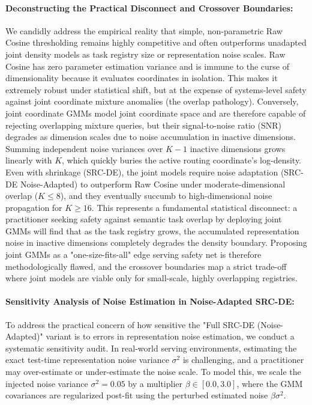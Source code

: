 \paragraph{Deconstructing the Practical Disconnect and Crossover Boundaries:} We candidly address the empirical reality that simple, non-parametric Raw Cosine thresholding remains highly competitive and often outperforms unadapted joint density models as task registry size or representation noise scales. Raw Cosine has zero parameter estimation variance and is immune to the curse of dimensionality because it evaluates coordinates in isolation. This makes it extremely robust under statistical shift, but at the expense of systems-level safety against joint coordinate mixture anomalies (the overlap pathology).
Conversely, joint coordinate GMMs model joint coordinate space and are therefore capable of rejecting overlapping mixture queries, but their signal-to-noise ratio (SNR) degrades as dimension scales due to noise accumulation in inactive dimensions. Summing independent noise variances over $K-1$ inactive dimensions grows linearly with $K$, which quickly buries the active routing coordinate's log-density. Even with shrinkage (SRC-DE), the joint models require noise adaptation (SRC-DE Noise-Adapted) to outperform Raw Cosine under moderate-dimensional overlap ($K \le 8$), and they eventually succumb to high-dimensional noise propagation for $K \ge 16$. This represents a fundamental statistical disconnect: a practitioner seeking safety against semantic task overlap by deploying joint GMMs will find that as the task registry grows, the accumulated representation noise in inactive dimensions completely degrades the density boundary. Proposing joint GMMs as a "one-size-fits-all" edge serving safety net is therefore methodologically flawed, and the crossover boundaries map a strict trade-off where joint models are viable only for small-scale, highly overlapping registries.

\paragraph{Sensitivity Analysis of Noise Estimation in Noise-Adapted SRC-DE:}
To address the practical concern of how sensitive the "Full SRC-DE (Noise-Adapted)" variant is to errors in representation noise estimation, we conduct a systematic sensitivity audit. In real-world serving environments, estimating the exact test-time representation noise variance $\sigma^2$ is challenging, and a practitioner may over-estimate or under-estimate the noise scale. To model this, we scale the injected noise variance $\sigma^2 = 0.05$ by a multiplier $\beta \in [0.0, 3.0]$, where the GMM covariances are regularized post-fit using the perturbed estimated noise $\beta \sigma^2$. 

